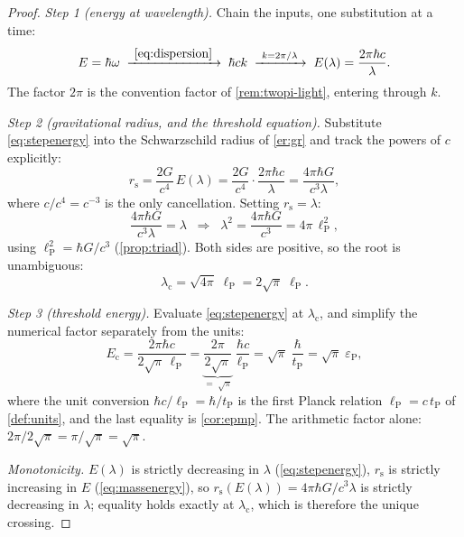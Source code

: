 \documentclass[11pt]{amsbook}
\theoremstyle{plain}
\theoremstyle{definition}
\theoremstyle{remark}
\begin{document}
\begin{proof}
\emph{Step 1 (energy at wavelength).} Chain the inputs, one substitution at a time:
\begin{equation}\label{eq:stepenergy}
E = \hbar \omega \;\xrightarrow{\ \cref{eq:dispersion}\ }\; \hbar c k \;\xrightarrow{\ k = 2\pi/\lambda\ }\; E(\lambda) = \frac{2\pi \hbar c}{\lambda}.
\end{equation}
The factor $2\pi$ is the convention factor of \cref{rem:twopi-light}, entering through $k$.

\emph{Step 2 (gravitational radius, and the threshold equation).} Substitute \cref{eq:stepenergy} into the Schwarzschild radius of \cref{er:gr} and track the powers of $c$ explicitly:
\begin{equation}\label{eq:stepradius}
r_{\mathrm s} = \frac{2 G}{c^{4}}\, E(\lambda) = \frac{2 G}{c^{4}} \cdot \frac{2\pi \hbar c}{\lambda} = \frac{4 \pi \hbar G}{c^{3} \lambda},
\end{equation}
where $c / c^{4} = c^{-3}$ is the only cancellation. Setting $r_{\mathrm s} = \lambda$:
\begin{equation}\label{eq:stepthreshold}
\frac{4 \pi \hbar G}{c^{3} \lambda} = \lambda
\;\;\Longrightarrow\;\;
\lambda^{2} = \frac{4 \pi \hbar G}{c^{3}} = 4\pi\, \ell_{\mathrm P}^{2},
\end{equation}
using $\ell_{\mathrm P}^{2} = \hbar G / c^{3}$ (\cref{prop:triad}). Both sides are positive, so the root is unambiguous:
\begin{equation}\label{eq:lamc}
\lambda_{\mathrm c} = \sqrt{4\pi}\; \ell_{\mathrm P} = 2\sqrt{\pi}\; \ell_{\mathrm P}.
\end{equation}

\emph{Step 3 (threshold energy).} Evaluate \cref{eq:stepenergy} at $\lambda_{\mathrm c}$, and simplify the numerical factor separately from the units:
\begin{equation}\label{eq:estep}
E_{\mathrm c} = \frac{2\pi \hbar c}{2\sqrt{\pi}\, \ell_{\mathrm P}} = \underbrace{\frac{2\pi}{2\sqrt{\pi}}}_{=\;\sqrt{\pi}}\; \frac{\hbar c}{\ell_{\mathrm P}} = \sqrt{\pi}\; \frac{\hbar}{t_{\mathrm P}} = \sqrt{\pi}\; \varepsilon_{\mathrm P},
\end{equation}
where the unit conversion $\hbar c / \ell_{\mathrm P} = \hbar / t_{\mathrm P}$ is the first Planck relation $\ell_{\mathrm P} = c\, t_{\mathrm P}$ of \cref{def:units}, and the last equality is \cref{cor:epmp}. The arithmetic factor alone: $2\pi / 2\sqrt{\pi} = \pi/\sqrt{\pi} = \sqrt{\pi}$.

\emph{Monotonicity.} $E(\lambda)$ is strictly decreasing in $\lambda$ (\cref{eq:stepenergy}), $r_{\mathrm s}$ is strictly increasing in $E$ (\cref{eq:massenergy}), so $r_{\mathrm s}(E(\lambda)) = 4\pi\hbar G / c^{3}\lambda$ is strictly decreasing in $\lambda$; equality holds exactly at $\lambda_{\mathrm c}$, which is therefore the unique crossing.
\end{proof}
\end{document}
